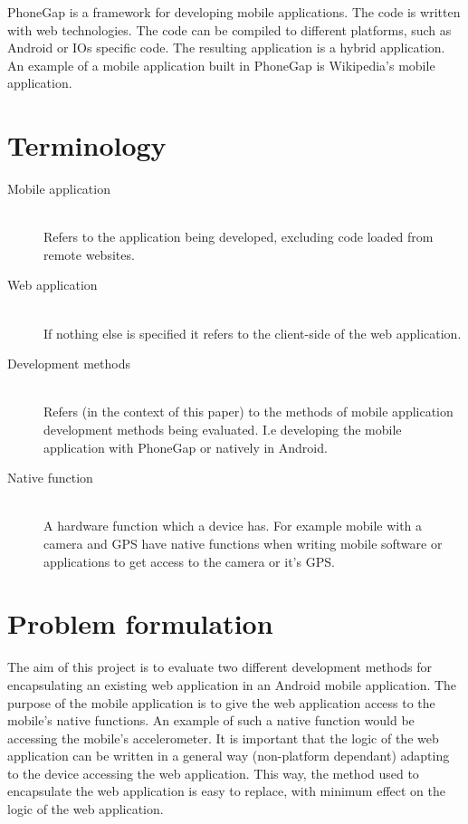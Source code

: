 PhoneGap is a framework for developing mobile applications. The code is written with web technologies. The code can be compiled to different platforms, such as Android or IOs specific code. The resulting application is a hybrid application. An example of a mobile application built in PhoneGap is Wikipedia's mobile application.  

\section{Terminology}
\begin{description}
  \item[Mobile application] \hfill \\
    Refers to the application being developed, excluding code loaded from remote websites.
  \item[Web application] \hfill \\
    If nothing else is specified it refers to the client-side of the web application.
  \item[Development methods] \hfill \\
    Refers (in the context of this paper) to the methods of mobile application development methods being evaluated. I.e developing the mobile application with PhoneGap or natively in Android.
  \item[Native function] \hfill \\
     A hardware function which a device has. For example mobile with a camera and GPS have native functions when writing mobile software or applications to get access to the camera or it's GPS.
\end{description}

\section{Problem formulation}
The aim of this project is to evaluate two different development methods for encapsulating an existing web application in an Android mobile application. The purpose of the mobile application is to give the web application access to the mobile's native functions. An example of such a native function would be accessing the mobile's accelerometer. It is important that the logic of the web application can be written in a general way (non-platform dependant) adapting to the device accessing the web application. This way, the method used to encapsulate the web application is easy to replace, with minimum effect on the logic of the web application. 

